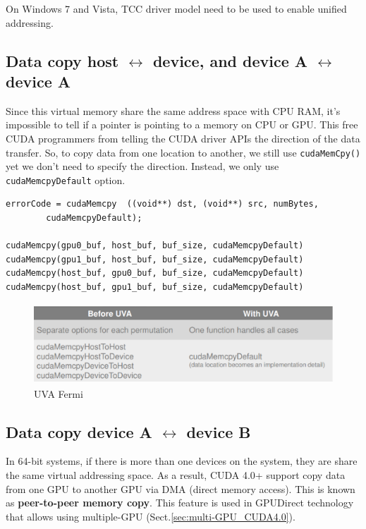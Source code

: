 \begin{framed}
On Windows 7 and Vista, TCC driver model need to be used to enable unified
addressing. 
\end{framed}
 
\subsection{Data copy host $\leftrightarrow$ device, and device A
$\leftrightarrow$ device A}

Since this virtual memory share the same address space with CPU RAM, it's
impossible to tell if a pointer is pointing to a memory on CPU or GPU. This free
CUDA programmers from telling the CUDA driver APIs the direction of the data
transfer. So, to copy data from one location to another, we still use
\verb!cudaMemCpy()! yet we don't need to specify the direction.
Instead, we only use \verb!cudaMemcpyDefault! option.

\begin{verbatim}
errorCode = cudaMemcpy  ((void**) dst, (void**) src, numBytes,
        cudaMemcpyDefault);
        
cudaMemcpy(gpu0_buf, host_buf, buf_size, cudaMemcpyDefault)
cudaMemcpy(gpu1_buf, host_buf, buf_size, cudaMemcpyDefault)
cudaMemcpy(host_buf, gpu0_buf, buf_size, cudaMemcpyDefault)
cudaMemcpy(host_buf, gpu1_buf, buf_size, cudaMemcpyDefault)
\end{verbatim}

\begin{figure}[hbt]
  \centerline{\includegraphics[height=3cm,
    angle=0]{./images/Fermi_UVA.eps}}
  \caption{UVA Fermi}
  \label{fig:Fermi_UVA}
\end{figure}

 
\subsection{Data copy device A $\leftrightarrow$ device B}

In 64-bit systems, if there is more than one devices on the system, they are
share the same virtual addressing space. As a result, CUDA 4.0+ support copy
data from one GPU to another GPU via DMA (direct memory access). This is known
as {\bf peer-to-peer memory copy}. This feature is used in GPUDirect technology
that allows using multiple-GPU (Sect.\ref{sec:multi-GPU_CUDA4.0}).

